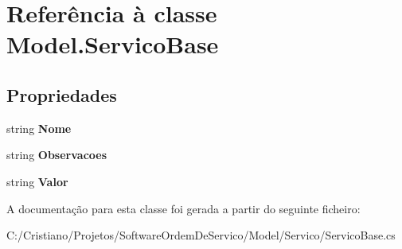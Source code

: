 \hypertarget{class_model_1_1_servico_base}{}\section{Referência à classe Model.\+Servico\+Base}
\label{class_model_1_1_servico_base}
\subsection*{Propriedades}
\begin{DoxyCompactItemize}
\item 
\hypertarget{class_model_1_1_servico_base_ac2c45d18a07ff5b924ed957f906d644b}{}string {\bfseries Nome}\label{class_model_1_1_servico_base_ac2c45d18a07ff5b924ed957f906d644b}

\item 
\hypertarget{class_model_1_1_servico_base_a195402514829e48905b0e63132af38a6}{}string {\bfseries Observacoes}\label{class_model_1_1_servico_base_a195402514829e48905b0e63132af38a6}

\item 
\hypertarget{class_model_1_1_servico_base_a23a7c8b19015291686c7c62ff7810267}{}string {\bfseries Valor}\label{class_model_1_1_servico_base_a23a7c8b19015291686c7c62ff7810267}

\end{DoxyCompactItemize}


A documentação para esta classe foi gerada a partir do seguinte ficheiro\+:\begin{DoxyCompactItemize}
\item 
C\+:/\+Cristiano/\+Projetos/\+Software\+Ordem\+De\+Servico/\+Model/\+Servico/Servico\+Base.\+cs\end{DoxyCompactItemize}
